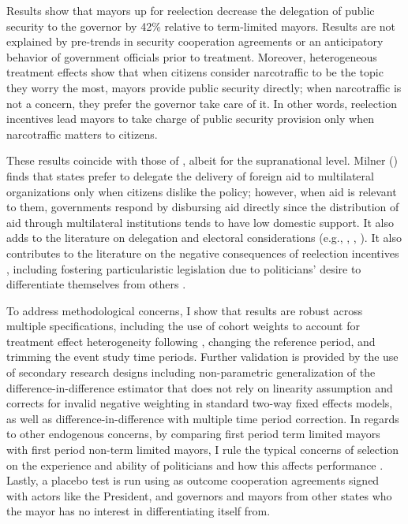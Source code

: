 \documentclass[12pt]{amsart}
\numberwithin{equation}{section}
\theoremstyle{definition}
\theoremstyle{definition}
\theoremstyle{definition}
\begin{document}
Results show that mayors up for reelection decrease the delegation of public security to the governor by 42\% relative to term-limited mayors. Results are not explained by pre-trends in security cooperation agreements or an anticipatory behavior of government officials prior to treatment.  Moreover, heterogeneous treatment effects show that when citizens consider narcotraffic to be the topic they worry the most, mayors provide public security directly; when narcotraffic is not a concern, they prefer the governor take care of it. In other words, reelection incentives lead mayors to take charge of public security provision only when narcotraffic matters to citizens.
 
These results coincide with those of \citet{milner_2004}, albeit for the supranational level. Milner (\citeyear{milner_2004}) finds that states prefer to delegate the delivery of foreign aid to multilateral organizations only when citizens dislike the policy; however, when aid is relevant to them, governments respond by disbursing aid directly since the distribution of aid through multilateral institutions tends to have low domestic support. It also adds to the literature on delegation and electoral considerations (e.g., \citet{mccubbins_1991}, \citet{fiorina_1982}, \citet{loftis_2014}). It also contributes to the literature on the negative consequences of reelection incentives \citep{coviello_etal_2017}, including fostering  particularistic legislation due to politicians' desire to differentiate themselves from others \citep{motolinia_2020}.             
       
To address methodological concerns, I show that results are robust across multiple specifications, including the use of cohort weights to account for treatment effect heterogeneity following \citet{abraham_sun_2020}, changing the reference period, and trimming the event study time periods. %
Further validation is provided by the use of secondary research designs including \citet{imai_etal_2020} non-parametric generalization of the difference-in-difference estimator that does not rely on linearity assumption and corrects for invalid negative weighting in standard two-way fixed effects models, as well as \citet{chaisemarting_etal_2019} difference-in-difference with multiple time period correction. In regards to other endogenous concerns, by comparing first period term limited mayors with first period non-term limited mayors, I rule the typical concerns of selection on the experience and ability of politicians \citep{samuelson_1984, dalbo_etal_2017} and how this affects performance \citep{ferraz_finan_2011}. Lastly, a placebo test is run using as outcome cooperation agreements signed with actors like the President, and governors and mayors from other states who the mayor has no interest in differentiating itself from.%
\end{document}
